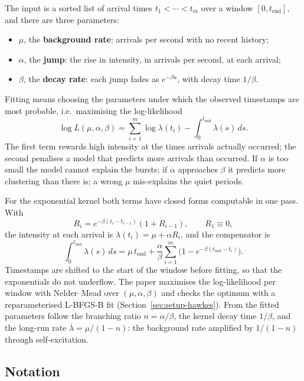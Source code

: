 The input is a sorted list of arrival times $t_1 < \cdots < t_m$ over a window
$[0, t_{\mathrm{end}}]$, and there are three parameters:
\begin{itemize}
    \item $\mu$, the \textbf{background rate}: arrivals per second with no recent history;
    \item $\alpha$, the \textbf{jump}: the rise in intensity, in arrivals per second, at
each arrival;
    \item $\beta$, the \textbf{decay rate}: each jump fades as $e^{-\beta u}$, with decay
time $1/\beta$.
\end{itemize}
Fitting means choosing the parameters under which the observed timestamps are most
probable, i.e.\ maximising the log-likelihood \citep{ozaki1979}
\begin{equation}
\log L(\mu, \alpha, \beta) = \sum_{i=1}^m \log \lambda(t_i) - \int_0^{t_{\mathrm{end}}} \lambda(s)\, ds.
\label{eq:hawkes-loglik}
\end{equation}
The first term rewards high intensity at the times arrivals actually occurred; the second
penalises a model that predicts more arrivals than occurred. If $\alpha$ is too small the
model cannot explain the bursts; if $\alpha$ approaches $\beta$ it predicts more clustering
than there is; a wrong $\mu$ mis-explains the quiet periods.

For the exponential kernel both terms have closed forms computable in one pass. With
$$R_i = e^{-\beta(t_i - t_{i-1})}(1 + R_{i-1}), \qquad R_1 \equiv 0,$$
the intensity at each arrival is $\lambda(t_i) = \mu + \alpha R_i$, and the compensator is
$$\int_0^{t_{\mathrm{end}}} \lambda(s)\, ds = \mu\, t_{\mathrm{end}} + \frac{\alpha}{\beta}
\sum_{i=1}^m\!\big(1 - e^{-\beta(t_{\mathrm{end}} - t_i)}\big).$$
Timestamps are shifted to the start of the window before fitting, so that the
exponentials do not underflow. The paper maximises the log-likelihood per window with
Nelder--Mead over $(\mu, \alpha, \beta)$ and checks the optimum with a reparameterised
L-BFGS-B fit (Section~\ref{sec:setup-hawkes}). From the fitted parameters follow the
branching ratio $n = \alpha/\beta$, the kernel decay time $1/\beta$, and the long-run
rate $\bar\lambda = \mu/(1 - n)$: the background rate amplified by $1/(1-n)$ through
self-excitation.

\subsection{Notation}
\label{app:pp-notation}

